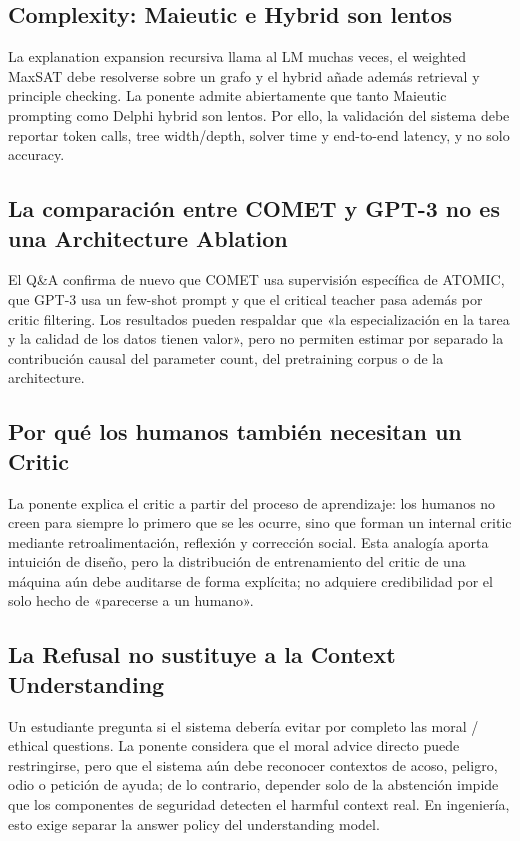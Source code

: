 \subsection{Complexity: Maieutic e Hybrid son lentos}

La explanation expansion recursiva llama al LM muchas veces, el weighted MaxSAT debe resolverse sobre un grafo y el hybrid añade además retrieval y principle checking. La ponente admite abiertamente que tanto Maieutic prompting como Delphi hybrid son lentos. Por ello, la validación del sistema debe reportar token calls, tree width/depth, solver time y end-to-end latency, y no solo accuracy.

\subsection{La comparación entre COMET y GPT-3 no es una Architecture Ablation}

El Q\&A confirma de nuevo que COMET usa supervisión específica de ATOMIC, que GPT-3 usa un few-shot prompt y que el critical teacher pasa además por critic filtering. Los resultados pueden respaldar que «la especialización en la tarea y la calidad de los datos tienen valor», pero no permiten estimar por separado la contribución causal del parameter count, del pretraining corpus o de la architecture.

\subsection{Por qué los humanos también necesitan un Critic}

La ponente explica el critic a partir del proceso de aprendizaje: los humanos no creen para siempre lo primero que se les ocurre, sino que forman un internal critic mediante retroalimentación, reflexión y corrección social. Esta analogía aporta intuición de diseño, pero la distribución de entrenamiento del critic de una máquina aún debe auditarse de forma explícita; no adquiere credibilidad por el solo hecho de «parecerse a un humano».

\subsection{La Refusal no sustituye a la Context Understanding}

Un estudiante pregunta si el sistema debería evitar por completo las moral / ethical questions. La ponente considera que el moral advice directo puede restringirse, pero que el sistema aún debe reconocer contextos de acoso, peligro, odio o petición de ayuda; de lo contrario, depender solo de la abstención impide que los componentes de seguridad detecten el harmful context real. En ingeniería, esto exige separar la answer policy del understanding model.

